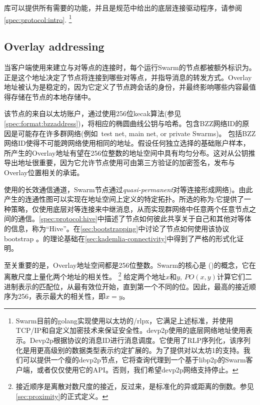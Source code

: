 库可以提供所有需要的功能，并且是规范中给出的底层连接驱动程序，请参阅\ref{spec:protocol:intro}.%
%
\footnote{Swarm目前的golang实现使用以太坊的/rlpx，它满足上述标准，并使用TCP/IP和自定义加密技术来保证安全性。devp2p使用的底层网络地址使用表示。Devp2p根据协议的消息ID进行消息调度。它使用了RLP序列化，该序列化是用更高级别的数据类型表示约定扩展的。为了提供对以太坊1的支持。我们可以提供一个瘦的devp2p节点，它将查询代理到一个基于libp2p的Swarm客户端，或者仅仅使用它的API。否则，我们希望devp2p网络支持停止。}

\subsection{Overlay addressing\statusgreen}\label{sec:overlay-addressing} 
\green{}

当客户端使用来建立与对等点的连接时，每个运行Swarm的节点都被额外标识为。正是这个地址决定了节点将连接到哪些对等点，并指导消息的转发方式。Overlay地址被认为是稳定的，因为它定义了节点跨会话的身份，并最终影响哪些内容最值得存储在节点的本地存储中。

该节点的来自以太坊账户，通过使用256位kecak算法(参见\ref{spec:format:bzzaddress})，将相应的椭圆曲线公钥与哈希。包含BZZ网络ID的原因是可能存在许多群网络(例如\ test net, main net, or private Swarms)。 包括BZZ网络ID使得不可能跨网络使用相同的地址。假设任何独立选择的基础账户样本，所产生的Overlay地址有望在256位整数的地址空间中具有均匀分布。这对从公钥推导出地址很重要，因为它允许节点使用可由第三方验证的加密签名，发布与Overlay位置相关的承诺。 

使用的长效通信通道，Swarm节点通过\emph{quasi-permanent}对等连接形成网络)。由此产生的连通性图可以实现在地址空间上定义的特定拓扑。所选的称为:它提供了一种策略，仅使用底层对等连接来中继消息，从而实现群网络中任意两个任意节点之间的通信。\ref{spec:protocol:hive}中描述了节点如何彼此共享关于自己和其他对等体的信息，称为“Hive”。在\ref{sec:bootstrapping}中讨论了节点如何使用该协议bootstrap 。的理论基础在\ref{sec:kademlia-connectivity}中得到了严格的形式化证明。

至关重要的是，Overlay地址空间都是256位整数。Swarm的核心是 ()的概念，它在离散尺度上量化两个地址的相关性。%
%
\footnote{接近顺序是离散对数尺度的接近，反过来，是标准化的异或距离的倒数。参见\ref{sec:proximity}的正式定义。}
%
给定两个地址$x$和$y$, $\mathit{PO}(x,y)$计算它们二进制表示的匹配位，从最有效位开始，直到第一个不同的位。因此，最高的接近顺序为256，表示最大的相关性，即$x=y$。

